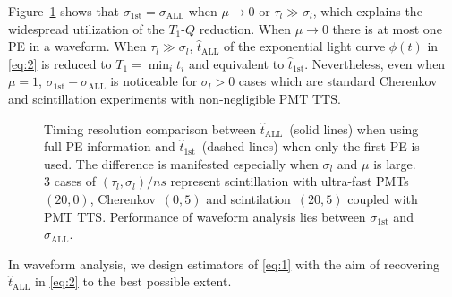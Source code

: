 Figure~\ref{fig:reso-diff} shows that $\sigma_{\mathrm{1st}}=\sigma_{\mathrm{ALL}}$ when $\mu \to 0$ or $\tau_l \gg \sigma_l$, which explains the widespread utilization of the $T_1$-$Q$ reduction.  When $\mu \to 0$ there is at most one PE in a waveform.  When $\tau_l \gg \sigma_l$, $\hat{t}_\mathrm{ALL}$ of the exponential light curve $\phi(t)$ in \eqref{eq:2} is reduced to $T_1 = \min_i t_i$ and equivalent to $\hat{t}_\mathrm{1st}$. Nevertheless, even when $\mu = 1$, $\sigma_{\mathrm{1st}} - \sigma_{\mathrm{ALL}}$ is noticeable for $\sigma_l > 0$ cases which are standard Cherenkov and scintillation experiments with non-negligible PMT TTS. 
\begin{figure}[H]
  \centering
  \resizebox{0.8\textwidth}{!}{}
  \caption{\label{fig:reso-diff} Timing resolution comparison between $\hat{t}_{\mathrm{ALL}}$~(solid lines) when using full PE information and $\hat{t}_\mathrm{1st}$~(dashed lines) when only the first PE is used.  The difference is manifested especially when $\sigma_l$ and $\mu$ is large.  3 cases of $(\tau_l, \sigma_l)/\si{ns}$ represent scintillation with ultra-fast PMTs~$(20,0)$, Cherenkov~$(0, 5)$ and scintilation~$(20, 5)$ coupled with PMT TTS. Performance of waveform analysis lies between $\sigma_{\mathrm{1st}}$ and $\sigma_{\mathrm{ALL}}$. }
\end{figure}

In waveform analysis, we design estimators of \eqref{eq:1} with the aim of recovering $\hat{t}_\mathrm{ALL}$ in \eqref{eq:2} to the best possible extent. 
